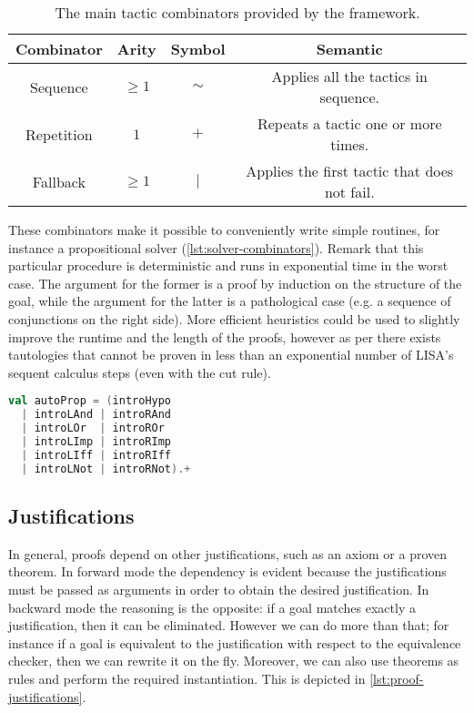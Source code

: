 \begin{table}[hbt!]
  \centering
  \begin{tabular}{||c c c c||}
  \hline
  \textbf{Combinator} & \textbf{Arity} & \textbf{Symbol} & \textbf{Semantic} \\
  \hline\hline
  Sequence & $\geq 1$ & $\sim$ & Applies all the tactics in sequence. \\ \hline
  Repetition & $1$ & $+$ & Repeats a tactic one or more times. \\ \hline
  Fallback & $\geq 1$ & $|$ & Applies the first tactic that does not fail. \\ \hline
  \end{tabular}
  \caption[Available combinators]{The main tactic combinators provided by the framework.}
  \label{tab:tactics-combinators}
\end{table}

These combinators make it possible to conveniently write simple routines, for instance a propositional solver (\autoref{lst:solver-combinators}). Remark that this particular procedure is deterministic and runs in exponential time in the worst case. The argument for the former is a proof by induction on the structure of the goal, while the argument for the latter is a pathological case (e.g. a sequence of conjunctions on the right side). More efficient heuristics could be used to slightly improve the runtime and the length of the proofs, however as per \cite{Krajicek1994} there exists tautologies that cannot be proven in less than an exponential number of LISA's sequent calculus steps (even with the cut rule).

\begin{lstlisting}[language=Scala,caption={[Propositional solver]{A propositional solver written using exclusively rules and tactic combinators.}},label={lst:solver-combinators},captionpos=b]
val autoProp = (introHypo
  | introLAnd | introRAnd
  | introLOr  | introROr
  | introLImp | introRImp
  | introLIff | introRIff
  | introLNot | introRNot).+
\end{lstlisting}

\subsection{Justifications}

In general, proofs depend on other justifications, such as an axiom or a proven theorem. In forward mode the dependency is evident because the justifications must be passed as arguments in order to obtain the desired justification. In backward mode the reasoning is the opposite: if a goal matches exactly a justification, then it can be eliminated. However we can do more than that; for instance if a goal is equivalent to the justification with respect to the equivalence checker, then we can rewrite it on the fly. Moreover, we can also use theorems as rules and perform the required instantiation. This is depicted in \autoref{lst:proof-justifications}.

